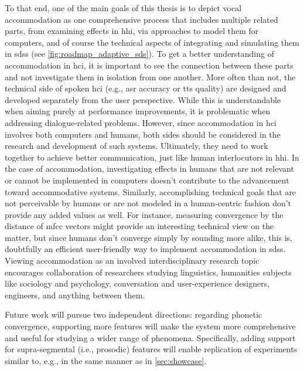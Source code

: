 To that end, one of the main goals of this thesis is to depict vocal accommodation as one comprehensive process that includes multiple related parts, from examining effects in \ac{hhi}, via approaches to model them for computers, and of course the technical aspects of integrating and simulating them in \acp{sds} (see \cref{fig:roadmap_adaptive_sds}).
To get a better understanding of accommodation in \ac{hci}, it is important to see the connection between these parts and not investigate them in isolation from one another.
More often than not, the technical side of spoken \ac{hci} (e.g., \ac{asr} accuracy or \ac{tts} quality) are designed and developed separately from the user perspective.
While this is understandable when aiming purely at performance improvements, it is problematic when addressing dialogue-related problems.
However, since accommodation in \ac{hci} involves both computers and humans, both sides should be considered in the research and development of such systems.
Ultimately, they need to work together to achieve better communication, just like human interlocutors in \ac{hhi}.
In the case of accommodation, investigating effects in humans that are not relevant or cannot be implemented in computers doesn't contribute to the advancement toward accommodative systems.
Similarly, accomplishing technical goals that are not perceivable by humans or are not modeled in a human-centric fashion don't provide any added values as well.
For instance, measuring convergence by the distance of \ac{mfcc} vectors \citep[as done by][]{Han2018you} might provide an interesting technical view on the matter, but since humans don't converge simply by sounding more alike, this is, doubtfully an efficient user-friendly way to implement accommodation in \acp{sds}.
Viewing accommodation as an involved interdisciplinary research topic encourages collaboration of researchers studying linguistics, humanities subjects like sociology and psychology, conversation and user-experience designers, engineers, and anything between them.



\citet{Babel2012role} %


\citet{Levitan2016implementing} %

Future work will pursue two independent directions:
regarding phonetic convergence, supporting more features will make the system more comprehensive and useful for studying a wider range of phenomena.
Specifically, adding support for supra-segmental (i.e., prosodic) features will enable replication of experiments similar to, e.g., \citet{Levitan2014acoustic, Levitan2016implementing} in the same manner as in \cref{sec:showcase}.

